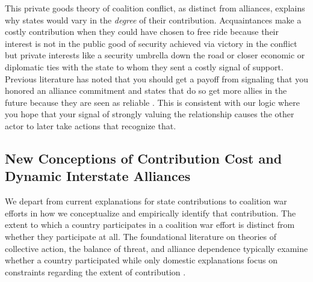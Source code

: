 \documentclass[12pt,letterpaper]{article}
\begin{document}
	This private goods theory of coalition conflict, as distinct from alliances, explains why states would vary in the \textit{degree} of their contribution. Acquaintances make a costly contribution when they could have chosen to free ride because their interest is not in the public good of security achieved via victory in the conflict but private interests like a security umbrella down the road or closer economic or diplomatic ties with the state to whom they sent a costly signal of support. Previous literature has noted that you should get a payoff from signaling that you honored an alliance commitment and states that do so get more allies in the future because they are seen as reliable \citep[427-428]{gibler_costsrenegingreputation_2008}. This is consistent with our logic where you hope that your signal of strongly valuing the relationship causes the other actor to later take actions that recognize that.
	
	\subsection{New Conceptions of Contribution Cost and Dynamic Interstate Alliances}
		We depart from current explanations for state contributions to coalition war efforts in how we conceptualize and empirically identify that contribution. The extent to which a country participates in a coalition war effort is distinct from whether they participate at all. The foundational literature on theories of collective action, the balance of threat, and alliance dependence typically examine whether a country participated while only domestic explanations focus on constraints regarding the extent of contribution \citep{bennett_burdensharingpersiangulf_1994, bogers_missionafghanistanwho_2013}.
	
\end{document}
